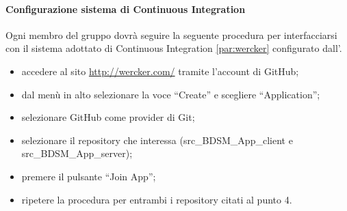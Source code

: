 			\paragraph{Configurazione sistema di Continuous Integration} %
			\label{par:configurazione_sistema_di_continuos_integration}
			Ogni membro del gruppo dovrà seguire la seguente procedura per interfacciarsi con il sistema adottato di Continuous Integration \ref{par:wercker} configurato dall'\roleAdministrator.
				\begin{itemize}
					\item accedere al sito \url{http://wercker.com/} tramite l'account di GitHub;
					\item dal menù in alto selezionare la voce ``Create'' e scegliere ``Application'';
					\item selezionare GitHub come provider di Git;
					\item selezionare il repository che interessa (src\_BDSM\_App\_client e src\_BDSM\_App\_server);
					\item premere il pulsante ``Join App'';
					\item ripetere la procedura per entrambi i repository citati al punto 4.
				\end{itemize}

